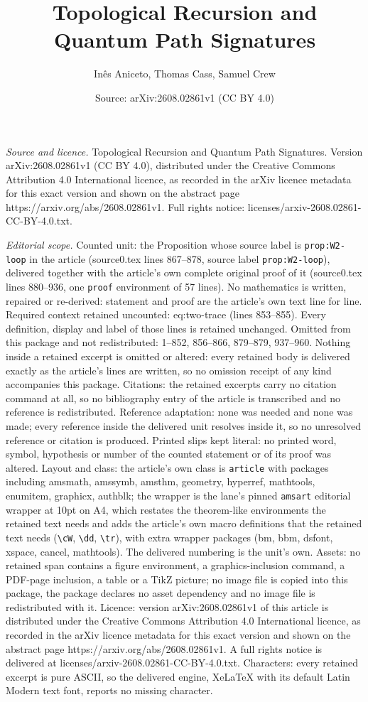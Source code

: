 \documentclass[10pt,a4paper]{amsart}
\title[Topological Recursion and Quantum Path Signatures]{Topological Recursion and Quantum Path Signatures}
\author{In\^es Aniceto, Thomas Cass, Samuel Crew}
\date{Source: arXiv:2608.02861v1 (CC BY 4.0)}
\begin{document}
\maketitle

\noindent\emph{Source and licence.} Topological Recursion and Quantum Path Signatures. Version arXiv:2608.02861v1 (CC BY 4.0), distributed under the Creative Commons Attribution 4.0 International licence, as recorded in the arXiv licence metadata for this exact version and shown on the abstract page https://arxiv.org/abs/2608.02861v1. Full rights notice: licenses/arxiv-2608.02861-CC-BY-4.0.txt.\par\smallskip

\noindent\textit{Editorial scope.} Counted unit: the Proposition whose source label is \texttt{prop:W2-loop} in the article (source0.tex lines 867--878, source label \texttt{prop:W2-loop}), delivered together with the article's own complete original proof of it (source0.tex lines 880--936, one \texttt{proof} environment of 57 lines). No mathematics is written, repaired or re-derived: statement and proof are the article's own text line for line. Required context retained uncounted: eq:two-trace (lines 853--855). Every definition, display and label of those lines is retained unchanged. Omitted from this package and not redistributed: 1--852, 856--866, 879--879, 937--960. Nothing inside a retained excerpt is omitted or altered: every retained body is delivered exactly as the article's lines are written, so no omission receipt of any kind accompanies this package. Citations: the retained excerpts carry no citation command at all, so no bibliography entry of the article is transcribed and no reference is redistributed. Reference adaptation: none was needed and none was made; every reference inside the delivered unit resolves inside it, so no unresolved reference or citation is produced. Printed slips kept literal: no printed word, symbol, hypothesis or number of the counted statement or of its proof was altered. Layout and class: the article's own class is \texttt{article} with packages including amsmath, amssymb, amsthm, geometry, hyperref, mathtools, enumitem, graphicx, authblk; the wrapper is the lane's pinned \texttt{amsart} editorial wrapper at 10pt on A4, which restates the theorem-like environments the retained text needs and adds the article's own macro definitions that the retained text needs (\texttt{\textbackslash cW}, \texttt{\textbackslash dd}, \texttt{\textbackslash tr}), with extra wrapper packages (bm, bbm, dsfont, xspace, cancel, mathtools). The delivered numbering is the unit's own. Assets: no retained span contains a figure environment, a graphics-inclusion command, a PDF-page inclusion, a table or a TikZ picture; no image file is copied into this package, the package declares no asset dependency and no image file is redistributed with it. Licence: version arXiv:2608.02861v1 of this article is distributed under the Creative Commons Attribution 4.0 International licence, as recorded in the arXiv licence metadata for this exact version and shown on the abstract page https://arxiv.org/abs/2608.02861v1. A full rights notice is delivered at licenses/arxiv-2608.02861-CC-BY-4.0.txt. Characters: every retained excerpt is pure ASCII, so the delivered engine, XeLaTeX with its default Latin Modern text font, reports no missing character.
\end{document}
